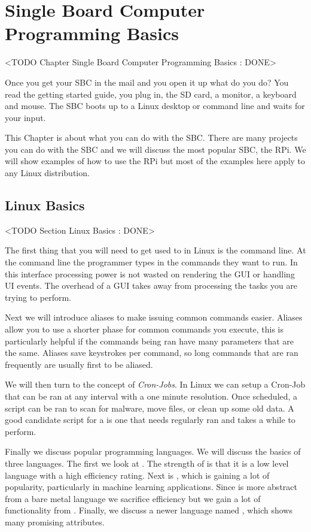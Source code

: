 \chapter{Single Board Computer Programming Basics}
	<TODO Chapter Single Board Computer Programming Basics : DONE>

Once you get your \ac{SBC} in the mail and you open it up what do you do? You read the getting started guide, you plug in, the \ac{SD} card, a monitor, a keyboard and mouse. The \ac{SBC} boots up to a Linux desktop or command line and waits for your input. 

This Chapter is about what you can do with the \ac{SBC}. There are many projects you can do with the \ac{SBC} and we will discuss the most popular \ac{SBC}, the \ac{RPi}. We will show examples of how to use the \ac{RPi} but most of the examples here apply to any Linux distribution. 

\section{Linux Basics}
	<TODO Section Linux Basics : DONE>

The first thing that you will need to get used to in Linux is the command line. At the command line the programmer types in the commands they want to run. In this interface processing power is not wasted on rendering the \ac{GUI} or handling \ac{UI} events. The overhead of a \ac{GUI} takes away from processing the tasks you are trying to perform. 

Next we will introduce aliases to make issuing common commands easier. Aliases allow you to use a shorter phase for common commands you execute, this is particularly helpful if the commands being ran have many parameters that are the same. Aliases save keystrokes per command, so long commands that are ran frequently are usually first to be aliased. 

We will then turn to the concept of \emph{Cron-Jobs}. In Linux we can setup a Cron-Job that can be ran at any interval with a one minute resolution. Once scheduled, a script can be ran to scan for malware, move files, or clean up some old data. A good candidate script for a  is one that needs regularly ran and takes a while to perform. 

Finally we discuss popular programming languages. We will discuss the basics of three languages. The first we look at . The strength of  is that it is a low level language with a high efficiency rating. Next is , which is gaining a lot of popularity, particularly in machine learning applications. Since  is more abstract from a bare metal language we sacrifice efficiency but we gain a lot of functionality from . Finally, we discuss a newer language named \emph{}, which shows many promising attributes.  
	
